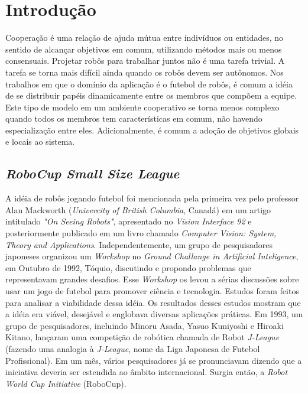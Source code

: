 \chapter{Introdução}

Cooperação é uma relação de ajuda mútua entre indivíduos ou entidades, no sentido
de alcançar objetivos em comum, utilizando métodos mais ou menos consensuais. Projetar
robôs para trabalhar juntos não é uma tarefa trivial. A tarefa se torna mais difícil
ainda quando os robôs devem ser autônomos. Nos trabalhos em que o domínio da aplicação
é o futebol de robôs, é comum a idéia de se distribuir papéis dinamicamente entre os
membros que compõem a equipe. Este tipo de modelo em um ambiente cooperativo se torna
menos complexo quando todos os membros tem características em comum, não havendo especialização
entre eles. Adicionalmente, é comum a adoção de objetivos globais e locais ao sistema.

\section{\textit{RoboCup Small Size League}}

A idéia de robôs jogando futebol foi mencionada pela primeira vez pelo professor
Alan Mackworth (\textit{Univercity of British Columbia}, Canadá) em um artigo intitulado
\textit{"On Seeing Robots"}, apresentado no \textit{Vision Interface 92} e posteriormente publicado em
um livro chamado \textit{Computer Vision: System, Theory and Applications}. Independentemente,
um grupo de pesquisadores japoneses organizou um \textit{Workshop} no \textit{Ground Challange
in Artificial Inteligence}, em Outubro de 1992, Tóquio, discutindo e propondo problemas que
representavam grandes desafios. Esse \textit{Workshop} os levou a sérias discussões sobre
usar um jogo de futebol para promover ciência e tecnologia. Estudos foram feitos para
analisar a viabilidade dessa idéia. Os resultados desses estudos mostram que
a idéia era viável, desejável e englobava diversas aplicações práticas. Em 1993, um
grupo de pesquisadores, incluindo Minoru Asada, Yasuo Kuniyoshi e Hiroaki Kitano,
lançaram uma competição de robótica chamada de Robot \textit{J-League} (fazendo uma analogia à
\textit{J-League}, nome da Liga Japonesa de Futebol Profissional). Em um mês, vários
pesquisadores já se pronunciavam dizendo que a iniciativa deveria ser estendida ao
âmbito internacional. Surgia então, a \textit{Robot World Cup Initiative} (RoboCup).

